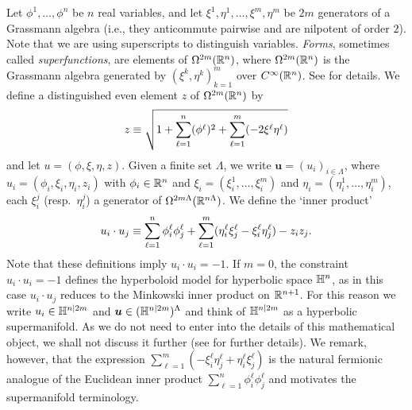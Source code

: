 \documentclass[11pt]{amsart}
\numberwithin{equation}{section}
\numberwithin{theorem}{section}
\newcommand{\V}[1]{\boldsymbol{#1}}
\begin{document}
Let $\phi^1,\dots, \phi^n$ be $n$ real variables, and let
$\xi^1,\eta^1,\dots,\xi^m,\eta^m$ be $2m$ generators of a Grassmann
algebra (i.e., they anticommute pairwise and are nilpotent of order
$2$). Note that we are using superscripts to distinguish
variables. \emph{Forms}, sometimes called \emph{superfunctions}, are
elements of $\Omega^{2m}(\mathbb{R}^n)$, where $\Omega^{2m}(\mathbb{R}^{n})$ is the
Grassmann algebra generated by $(\xi^k,\eta^k)_{k=1}^m$ over
$C^\infty(\mathbb{R}^n)$. See \cite[Appendix~A]{1904.01532} for details.  We
define a distinguished even element $z$ of $\Omega^{2m}(\mathbb{R}^n)$ by
\begin{equation}
  \label{eq:zHnm}
  z \equiv \sqrt{1+\sum_{\ell=1}^n (\phi^\ell)^2 + \sum_{\ell=1}^m (-2\xi^\ell\eta^\ell)}
\end{equation}
and let $u = (\phi,\xi, \eta,z)$.   Given a finite set $\Lambda$, we write
$\V{u} = (u_i)_{i\in\Lambda}$, where 
$u_i=(\phi_i, \xi_i, \eta_i, z_i)$ with
$\phi_i\in \mathbb{R}^{n}$ and
$\xi_i=(\xi_{i}^{1},\dots,\xi_{i}^{m})$ and
$\eta_i=(\eta_{i}^{1},\dots,\eta_{i}^{m})$, each $\xi_{i}^{j}$ (resp.\
$\eta_{i}^{j}$) a generator of $\Omega^{2m\Lambda}(\mathbb{R}^{n\Lambda})$. 
We define the `inner product'
\begin{equation}
  \label{eq:IP}
  u_{i}\cdot u_{j}
  \equiv
  \sum_{\ell=1}^{n}\phi^{\ell}_{i}\phi^{\ell}_{j} +
  \sum_{\ell=1}^{m} (\eta_{i}^{\ell}\xi_{j}^{\ell}-\xi_{i}^{\ell}\eta_{j}^{\ell})
  -z_{i}z_{j}
.
\end{equation}
Note that these definitions imply $u_i\cdot u_i = -1$. If $m=0$,
the constraint $u_i\cdot u_i=-1$ defines the hyperboloid model for
hyperbolic space $\mathbb{H}^n$, as in this case $u_i \cdot u_j$ reduces to the
Minkowski inner product on $\mathbb{R}^{n+1}$. For this reason
we write $u_i\in\mathbb{H}^{n|2m}$ and $\V{u}\in (\HH^{n|2m})^\Lambda$ and
think of $\mathbb{H}^{n|2m}$ as a hyperbolic supermanifold.
As we do not need to enter into the details of this mathematical
object, we shall not discuss it further (see \cite{MR1411617} for further details).
We remark, however, that the expression
$\sum_{\ell=1}^{m} (-\xi_i^\ell\eta_j^\ell +\eta_i^\ell\xi_j^\ell)$ is
the natural fermionic analogue of the Euclidean inner product
$\sum_{\ell=1}^{n}\phi_i^\ell \phi_j^\ell$ and motivates the 
supermanifold terminology.
\end{document}

